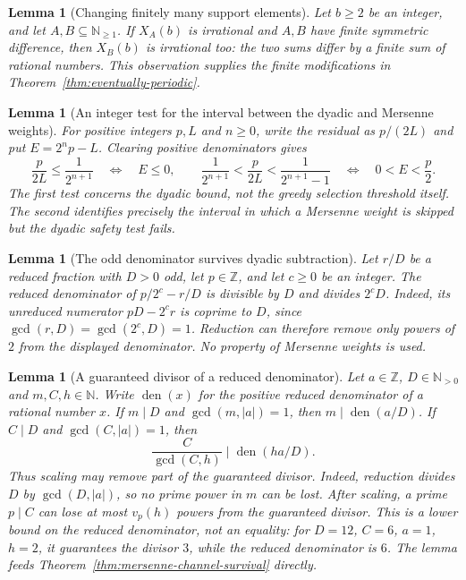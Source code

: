 \documentclass[11pt]{article}
\theoremstyle{plain}
\newtheorem{lem}[thm]{Lemma}
\theoremstyle{definition}
\theoremstyle{remark}
\begin{document}
\begin{lem}[Changing finitely many support elements]
\label{lem:tail-transfer}
Let $b\ge2$ be an integer, and let $A,B\subseteq\mathbb N_{\ge1}$.
If $X_A(b)$ is irrational and $A,B$ have finite symmetric difference, then $X_B(b)$ is irrational too: the two sums differ by a finite sum of
rational numbers.  This observation supplies the finite modifications in
Theorem~\ref{thm:eventually-periodic}.
\end{lem}

\begin{lem}[An integer test for the interval between the dyadic and Mersenne weights]
\label{lem:dyadic-excess-reformulation}
For positive integers $p,L$ and $n\ge0$, write the residual as $p/(2L)$
and put $E=2^np-L$.  Clearing positive denominators gives
\[
 \frac{p}{2L}\le\frac1{2^{n+1}}\quad\Longleftrightarrow\quad E\le0,
 \qquad
 \frac1{2^{n+1}}<\frac{p}{2L}<\frac1{2^{n+1}-1}
 \quad\Longleftrightarrow\quad 0<E<\frac p2.
\]
The first test concerns the dyadic bound, not the greedy selection
threshold itself.  The second identifies precisely the interval in
which a Mersenne weight is skipped but the dyadic safety test fails.
\end{lem}

\begin{lem}[The odd denominator survives dyadic subtraction]
\label{lem:denominator-sandwich}
Let $r/D$ be a reduced fraction with $D>0$ odd, let $p\in\mathbb Z$,
and let $c\ge0$ be an integer.  The reduced denominator of
$p/2^c-r/D$ is divisible by $D$ and divides $2^cD$.
Indeed, its unreduced numerator $pD-2^cr$ is coprime to $D$,
since $\gcd(r,D)=\gcd(2^c,D)=1$.  Reduction can therefore remove
only powers of $2$ from the displayed denominator.  No property
of Mersenne weights is used.
\end{lem}

\begin{lem}[A guaranteed divisor of a reduced denominator]
\label{lem:denominator-survival}
Let $a\in\mathbb Z$, $D\in\mathbb N_{>0}$ and $m,C,h\in\mathbb N$.
Write $\operatorname{den}(x)$ for the positive reduced denominator of
a rational number $x$.  If $m\mid D$ and $\gcd(m,|a|)=1$, then
$m\mid\operatorname{den}(a/D)$.  If $C\mid D$ and $\gcd(C,|a|)=1$, then
\[
 \frac{C}{\gcd(C,h)}\mid\operatorname{den}(ha/D).
\]
Thus scaling may remove part of the guaranteed divisor.
Indeed, reduction divides $D$ by $\gcd(D,|a|)$, so no prime power in $m$
can be lost. After scaling, a prime $p\mid C$ can lose at most $v_p(h)$
powers from the guaranteed divisor. This is a lower bound on the reduced
denominator, not an equality: for $D=12$, $C=6$, $a=1$, $h=2$, it guarantees
the divisor $3$, while the reduced denominator is $6$.
The lemma feeds Theorem~\ref{thm:mersenne-channel-survival} directly.
\end{lem}
\end{document}
